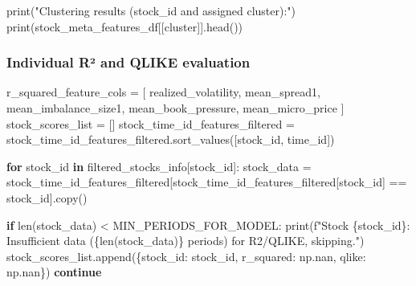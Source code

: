 \documentclass[
  letterpaper,
  DIV=11,
  numbers=noendperiod]{scrartcl}
\newenvironment{Shaded}{\begin{snugshade}}{\end{snugshade}}
\newcommand{\BuiltInTok}[1]{\textcolor[rgb]{0.00,0.23,0.31}{#1}}
\newcommand{\ControlFlowTok}[1]{\textcolor[rgb]{0.00,0.23,0.31}{\textbf{#1}}}
\newcommand{\KeywordTok}[1]{\textcolor[rgb]{0.00,0.23,0.31}{\textbf{#1}}}
\newcommand{\NormalTok}[1]{\textcolor[rgb]{0.00,0.23,0.31}{#1}}
\newcommand{\OperatorTok}[1]{\textcolor[rgb]{0.37,0.37,0.37}{#1}}
\newcommand{\SpecialCharTok}[1]{\textcolor[rgb]{0.37,0.37,0.37}{#1}}
\newcommand{\SpecialStringTok}[1]{\textcolor[rgb]{0.13,0.47,0.30}{#1}}
\newcommand{\StringTok}[1]{\textcolor[rgb]{0.13,0.47,0.30}{#1}}
\begin{document}
\begin{Shaded}
\begin{Highlighting}[]
\BuiltInTok{print}\NormalTok{(}\StringTok{"Clustering results (stock\_id and assigned cluster):"}\NormalTok{)}
\BuiltInTok{print}\NormalTok{(stock\_meta\_features\_df[[}\StringTok{\textquotesingle{}cluster\textquotesingle{}}\NormalTok{]].head())}
\end{Highlighting}
\end{Shaded}

\subsubsection{Individual R² and QLIKE
evaluation}\label{individual-ruxb2-and-qlike-evaluation}

\begin{Shaded}
\begin{Highlighting}[]
\NormalTok{r\_squared\_feature\_cols }\OperatorTok{=}\NormalTok{ [}
    \StringTok{\textquotesingle{}realized\_volatility\textquotesingle{}}\NormalTok{, }\StringTok{\textquotesingle{}mean\_spread1\textquotesingle{}}\NormalTok{, }\StringTok{\textquotesingle{}mean\_imbalance\_size1\textquotesingle{}}\NormalTok{, }
    \StringTok{\textquotesingle{}mean\_book\_pressure\textquotesingle{}}\NormalTok{, }\StringTok{\textquotesingle{}mean\_micro\_price\textquotesingle{}}
\NormalTok{]}
\NormalTok{stock\_scores\_list }\OperatorTok{=}\NormalTok{ []}
\NormalTok{stock\_time\_id\_features\_filtered }\OperatorTok{=}\NormalTok{ stock\_time\_id\_features\_filtered.sort\_values([}\StringTok{\textquotesingle{}stock\_id\textquotesingle{}}\NormalTok{, }\StringTok{\textquotesingle{}time\_id\textquotesingle{}}\NormalTok{])}

\ControlFlowTok{for}\NormalTok{ stock\_id }\KeywordTok{in}\NormalTok{ filtered\_stocks\_info[}\StringTok{\textquotesingle{}stock\_id\textquotesingle{}}\NormalTok{]:}
\NormalTok{    stock\_data }\OperatorTok{=}\NormalTok{ stock\_time\_id\_features\_filtered[stock\_time\_id\_features\_filtered[}\StringTok{\textquotesingle{}stock\_id\textquotesingle{}}\NormalTok{] }\OperatorTok{==}\NormalTok{ stock\_id].copy()}
    
    \ControlFlowTok{if} \BuiltInTok{len}\NormalTok{(stock\_data) }\OperatorTok{\textless{}}\NormalTok{ MIN\_PERIODS\_FOR\_MODEL:}
        \BuiltInTok{print}\NormalTok{(}\SpecialStringTok{f"Stock }\SpecialCharTok{\{}\NormalTok{stock\_id}\SpecialCharTok{\}}\SpecialStringTok{: Insufficient data (}\SpecialCharTok{\{}\BuiltInTok{len}\NormalTok{(stock\_data)}\SpecialCharTok{\}}\SpecialStringTok{ periods) for R2/QLIKE, skipping."}\NormalTok{)}
\NormalTok{        stock\_scores\_list.append(\{}\StringTok{\textquotesingle{}stock\_id\textquotesingle{}}\NormalTok{: stock\_id, }\StringTok{\textquotesingle{}r\_squared\textquotesingle{}}\NormalTok{: np.nan, }\StringTok{\textquotesingle{}qlike\textquotesingle{}}\NormalTok{: np.nan\})}
        \ControlFlowTok{continue}


\end{Highlighting}
\end{Shaded}
\end{document}
